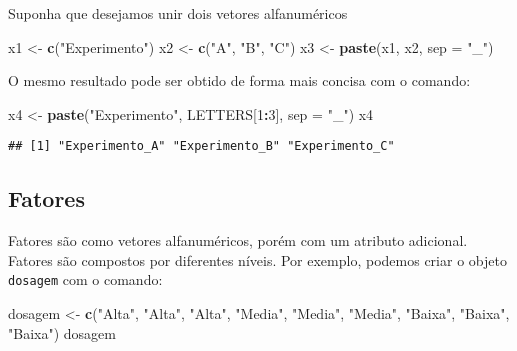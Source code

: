 \documentclass[
]{book}
\newenvironment{Shaded}{\begin{snugshade}}{\end{snugshade}}
\newcommand{\DataTypeTok}[1]{\textcolor[rgb]{0.13,0.29,0.53}{#1}}
\newcommand{\DecValTok}[1]{\textcolor[rgb]{0.00,0.00,0.81}{#1}}
\newcommand{\KeywordTok}[1]{\textcolor[rgb]{0.13,0.29,0.53}{\textbf{#1}}}
\newcommand{\NormalTok}[1]{#1}
\newcommand{\OperatorTok}[1]{\textcolor[rgb]{0.81,0.36,0.00}{\textbf{#1}}}
\newcommand{\StringTok}[1]{\textcolor[rgb]{0.31,0.60,0.02}{#1}}
\begin{document}
Suponha que desejamos unir dois vetores alfanuméricos

\begin{Shaded}
\begin{Highlighting}[]
\NormalTok{x1 <-}\StringTok{ }\KeywordTok{c}\NormalTok{(}\StringTok{"Experimento"}\NormalTok{)}
\NormalTok{x2 <-}\StringTok{ }\KeywordTok{c}\NormalTok{(}\StringTok{"A"}\NormalTok{, }\StringTok{"B"}\NormalTok{, }\StringTok{"C"}\NormalTok{)}
\NormalTok{x3 <-}\StringTok{ }\KeywordTok{paste}\NormalTok{(x1, x2, }\DataTypeTok{sep =} \StringTok{"_"}\NormalTok{)}
\end{Highlighting}
\end{Shaded}

O mesmo resultado pode ser obtido de forma mais concisa com o comando:

\begin{Shaded}
\begin{Highlighting}[]
\NormalTok{x4 <-}\StringTok{ }\KeywordTok{paste}\NormalTok{(}\StringTok{"Experimento"}\NormalTok{, LETTERS[}\DecValTok{1}\OperatorTok{:}\DecValTok{3}\NormalTok{], }\DataTypeTok{sep =} \StringTok{"_"}\NormalTok{)}
\NormalTok{x4}
\end{Highlighting}
\end{Shaded}

\begin{verbatim}
## [1] "Experimento_A" "Experimento_B" "Experimento_C"
\end{verbatim}

\hypertarget{fatores}{%
\subsection{Fatores}\label{fatores}}

Fatores são como vetores alfanuméricos, porém com um atributo adicional. Fatores são compostos por diferentes níveis. Por exemplo, podemos criar o objeto \texttt{dosagem} com o comando:

\begin{Shaded}
\begin{Highlighting}[]
\NormalTok{dosagem <-}\StringTok{ }\KeywordTok{c}\NormalTok{(}\StringTok{"Alta"}\NormalTok{, }\StringTok{"Alta"}\NormalTok{, }\StringTok{"Alta"}\NormalTok{, }
            \StringTok{"Media"}\NormalTok{, }\StringTok{"Media"}\NormalTok{, }\StringTok{"Media"}\NormalTok{, }
            \StringTok{"Baixa"}\NormalTok{, }\StringTok{"Baixa"}\NormalTok{, }\StringTok{"Baixa"}\NormalTok{)}
\NormalTok{dosagem}
\end{Highlighting}
\end{Shaded}
\end{document}
